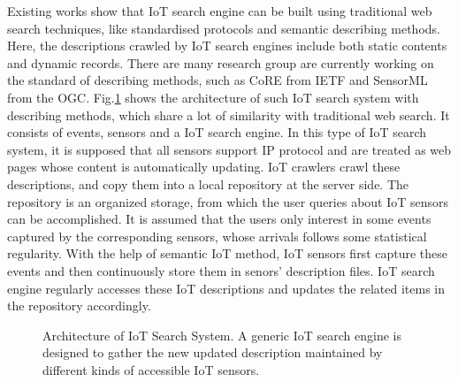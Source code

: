 \documentclass[conference]{IEEEtran}
\begin{document}
Existing works show that IoT search engine can be built using traditional web search techniques, like standardised protocols and semantic describing methods\cite{Pfisterer2011}. 
Here, the descriptions crawled by IoT search engines include both static contents and dynamic records.
There are many research group are currently working on the standard of describing methods, such as CoRE\cite{CoREWorkingGroup2012} from IETF and SensorML\cite{botts2007opengis} from the OGC. 
Fig.\ref{fig:architecture} shows the architecture of such IoT search system with describing methods, which share a lot of similarity with traditional web search.
It consists of events, sensors and a IoT search engine.
In this type of IoT search system, it is supposed that all sensors support IP protocol and are treated as web pages whose content is automatically updating.
IoT crawlers crawl these descriptions, and copy them into a local repository at the server side. 
The repository is an organized storage, from which the user queries about IoT sensors can be accomplished.
It is assumed that the users only interest in some events captured by the corresponding sensors, whose arrivals follows some statistical regularity. 
With the help of semantic IoT method, IoT sensors first capture these events and then continuously store them in senors' description files. 
IoT search engine regularly accesses these IoT descriptions and updates the related items in the repository accordingly. 

\begin{figure}
	\vspace{0.5em}
	\centering
	\hspace{-3.0em}
	
	\captionsetup{justification=justified, singlelinecheck=false}
	\caption{Architecture of IoT Search System. A generic IoT search engine is designed to gather the new updated description maintained by different kinds of accessible IoT sensors.}
	\vspace{-1.0em}
	\label{fig:architecture}
\end{figure}
\end{document}
